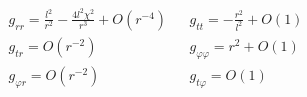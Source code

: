 \begin{equation}
\begin{array}{lll}
g_{rr}=\displaystyle \frac{l^{2}}{r^{2}}-\frac{4l^{2}\chi ^{2}}{r^{3}}%
+O(r^{-4}) &  & \displaystyle g_{tt}=-\frac{r^{2}}{l^{2}}+O(1) \\[2mm]
g_{tr}=O(r^{-2}) &  & g_{\varphi \varphi }=r^{2}+O(1) \\[1mm]
g_{\varphi r}=O(r^{-2}) &  & g_{t\varphi }=O(1)
\end{array}
\label{AsymptGeneral}
\end{equation}

